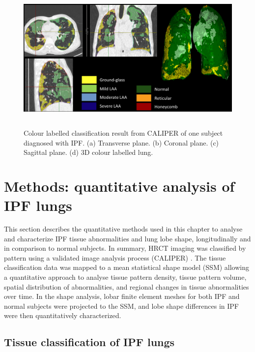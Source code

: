 \begin{figure}[htbp]
  \centering 
  \includegraphics[height=2.9in]{QuantitativeAnalysis/Image/CALIPERResults.png}
  \caption{Colour labelled classification result from CALIPER of one subject diagnosed with IPF.  (a) Transverse plane. (b) Coronal plane. (c) Sagittal plane. (d) 3D colour labelled lung.}
  \label{fig:CALIPERResults}
\end{figure}


\section{Methods: quantitative analysis of IPF lungs}
This section describes the quantitative methods used in this chapter to analyse and characterize IPF tissue abnormalities and lung lobe shape, longitudinally and in comparison to normal subjects. In summary, HRCT imaging was classified by pattern using a validated image analysis process (CALIPER) \citep{maldonado2013automated,bartholmai2013quantitative,raghunath2014quantitative}. The tissue classification data was mapped to a mean statistical shape model (SSM) allowing a quantitative approach to analyse tissue pattern density, tissue pattern volume, spatial distribution of abnormalities, and regional changes in tissue abnormalities over time. In the shape analysis, lobar finite element meshes for both IPF and normal subjects were projected to the SSM, and lobe shape differences in IPF were then quantitatively characterized.

\subsection{Tissue classification of IPF lungs}
